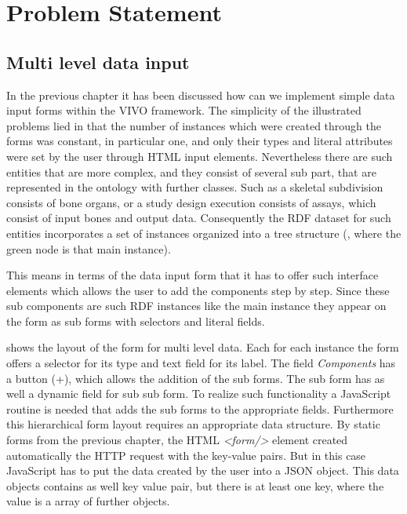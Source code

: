 \chapter{Problem Statement}


\section{Multi level data input}


In the previous chapter it has been discussed how can we implement simple data input forms within the VIVO framework. The simplicity of the illustrated problems lied in that the number of instances which were created through the forms was constant, in particular one, and only their types and literal attributes were set by the user through HTML input elements. Nevertheless there are such entities that are more complex, and they consist of several sub part, that are represented in the ontology with further classes. Such as a skeletal subdivision consists of bone organs, or a study design execution consists of assays, which consist of input bones and output data. Consequently the RDF dataset for such entities incorporates a set of instances organized into a tree structure (, where the green node is that main instance).



This means in terms of the data input form that it has to offer such interface elements which allows the user to add the components step by step. Since these sub components are such RDF instances like the main instance they appear on the form as sub forms with selectors and literal fields. 




 shows the layout of the form for multi level data. Each for each instance the form offers a selector for its type and text field for its label. The field \textit{Components} has a button (+), which allows the addition of the sub forms. The sub form has as well a dynamic field for sub sub form. To realize such functionality a JavaScript routine is needed that adds the sub forms to the appropriate fields. 
Furthermore this hierarchical form layout requires an appropriate data structure. By static forms from the previous chapter, the HTML \textit{<form/>} element created automatically the HTTP request with the key-value pairs. But in this case JavaScript has to put the data created by the user into a JSON object. This data objects contains as well key value pair, but there is at least one key, where the value is a array of further objects. 


